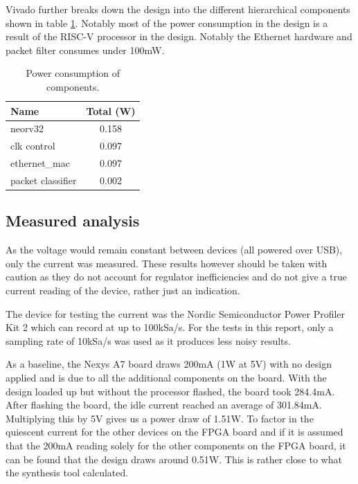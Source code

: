 Vivado further breaks down the design into the different hierarchical components shown in table \ref{tab:power_consumption}. Notably most of the power consumption in the design is a result of the RISC-V processor in the design. Notably the Ethernet hardware and packet filter consumes under 100mW. 

\begin{table}
    \centering
    \caption{Power consumption of components.}
    \begin{tabular}{lc}
        \toprule
        Name & Total (W) \\
        \midrule
        neorv32 & 0.158 \\
        clk control & 0.097 \\
        ethernet\_mac & 0.097 \\
        packet classifier & 0.002 \\
        \bottomrule
    \end{tabular}
    \label{tab:power_consumption}
\end{table}






\subsection{Measured analysis}

As the voltage would remain constant between devices (all powered over USB), only the current was measured. These results however should be taken with caution as they do not account for regulator inefficiencies and do not give a true current reading of the device, rather just an indication. 


The device for testing the current was the Nordic Semiconductor Power Profiler Kit 2 which can record at up to 100kSa/s. For the tests in this report, only a sampling rate of 10kSa/s was used as it produces less noisy results. 

As a baseline, the Nexys A7 board draws 200mA (1W at 5V) with no design applied and is due to all the additional components on the board. With the design loaded up but without the processor flashed, the board took 284.4mA. After flashing the board, the idle current reached an average of 301.84mA. Multiplying this by 5V gives us a power draw of 1.51W. To factor in the quiescent current for the other devices on the FPGA board and if it is assumed that the 200mA reading solely for the other components on the FPGA board, it can be found that the design draws around 0.51W. This is rather close to what the synthesis tool calculated. 

